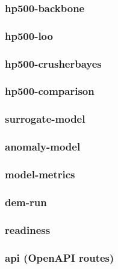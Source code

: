 \subsubsection*{hp500-backbone}

\subsubsection*{hp500-loo}

\subsubsection*{hp500-crusherbayes}

\subsubsection*{hp500-comparison}

\subsubsection*{surrogate-model}

\subsubsection*{anomaly-model}

\subsubsection*{model-metrics}

\subsubsection*{dem-run}

\subsubsection*{readiness}

\subsubsection*{api (OpenAPI routes)}

